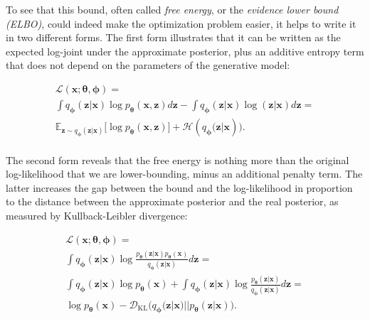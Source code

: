 \documentclass{report}
\begin{document}
\noindent To see that this bound, often called \textit{free energy}, or the \textit{evidence lower bound (ELBO)}, could indeed make the optimization problem easier, it helps to write it in two different forms. The first form illustrates that it can be written as the expected log-joint under the approximate posterior, plus an additive entropy term that does not depend on the parameters of the generative model:

\begin{equation}
\begin{gathered}
\mathcal{L}(\boldsymbol{x}; \boldsymbol{\theta}, \boldsymbol{\phi}) = \\
\int q_{\boldsymbol{\phi}} (\boldsymbol{z}|\boldsymbol{x}) \log p_{\boldsymbol{\theta}}(\boldsymbol{x}, \boldsymbol{z}) d \boldsymbol{z} - \int q_{\boldsymbol{\phi}} (\boldsymbol{z}|\boldsymbol{x}) \log (\boldsymbol{z}|\boldsymbol{x}) d \boldsymbol{z} = \\
\mathbb{E}_{\boldsymbol{z} \sim q_{\boldsymbol{\phi}}(\boldsymbol{z}|\boldsymbol{x})} \big[ \log p_{\boldsymbol{\theta}}(\boldsymbol{x}, \boldsymbol{z}) \big] + \mathcal{H}(q_{\boldsymbol{\phi}} \big(\boldsymbol{z}|\boldsymbol{x}) \big).
\end{gathered}
\label{eq:free-energy-entropy}
\end{equation} \\

\noindent The second form reveals that the free energy is nothing more than the original log-likelihood that we are lower-bounding, minus an additional penalty term. The latter increases the gap between the bound and the log-likelihood in proportion to the distance between the approximate posterior and the real posterior, as measured by Kullback-Leibler divergence:

\begin{equation}
\begin{gathered}
\mathcal{L}(\boldsymbol{x}; \boldsymbol{\theta}, \boldsymbol{\phi}) = \\
\int q_{\boldsymbol{\phi}}(\boldsymbol{z}|\boldsymbol{x}) \log \frac{p_{\boldsymbol{\theta}}(\boldsymbol{z}|\boldsymbol{x})p_{\boldsymbol{\theta}}(\boldsymbol{x})}{q_{\boldsymbol{\phi}}(\boldsymbol{z}|\boldsymbol{x})} d \boldsymbol{z} = \\
\int q_{\boldsymbol{\phi}}(\boldsymbol{z}|\boldsymbol{x}) \log p_{\boldsymbol{\theta}} (\boldsymbol{x}) + \int q_{\boldsymbol{\phi}}(\boldsymbol{z}|\boldsymbol{x}) \log \frac{p_{\boldsymbol{\theta}}(\boldsymbol{z}|\boldsymbol{x})}{q_{\boldsymbol{\phi}}(\boldsymbol{z}|\boldsymbol{x})} d \boldsymbol{z} = \\
\log p_{\boldsymbol{\theta}} (\boldsymbol{x}) - \mathcal{D}_\text{KL}\big(q_{\boldsymbol{\phi}}(\boldsymbol{z}|\boldsymbol{x}) || p_{\boldsymbol{\theta}}(\boldsymbol{z}|\boldsymbol{x}) \big).
\end{gathered}
\label{eq:free-energy-kl}
\end{equation} \\
\end{document}

